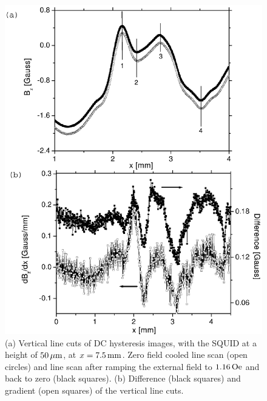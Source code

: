 \begin{figure}[p]
\includegraphics[width=5.7in]{figs/magpen/dcline.ps}
\caption[Before and after line cuts of DC hysteresis 
images at a height of $50\,\micron$.]
{(a) 
Vertical line cuts of DC hysteresis images, with the SQUID at a height of
$50\,\micron$, at $x=7.5\,\mathrm{mm}$. 
Zero field cooled line scan (open circles) and line scan after 
ramping the external field to $1.16\,\mathrm{Oe}$ and back to zero
(black squares). 
(b) Difference (black squares) and gradient (open squares) of the
vertical line cuts.
}
\label{fig:dc_hist_cuts_high_a}
\label{fig:dc_hist_cuts_high_b}
\end{figure}

%
%

